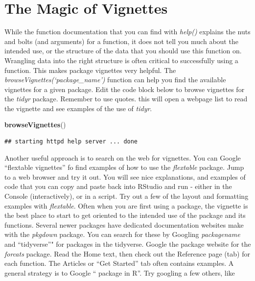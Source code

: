 \documentclass[
]{book}
\newenvironment{Shaded}{\begin{snugshade}}{\end{snugshade}}
\newcommand{\KeywordTok}[1]{\textcolor[rgb]{0.13,0.29,0.53}{\textbf{#1}}}
\newcommand{\NormalTok}[1]{#1}
\begin{document}
\hypertarget{the-magic-of-vignettes}{%
\section{The Magic of Vignettes}\label{the-magic-of-vignettes}}

While the function documentation that you can find with \emph{help()} explains the nuts and bolts (and arguments) for a function, it does not tell you much about the intended use, or the structure of the data that you should use this function on. Wrangling data into the right structure is often critical to successfully using a function.
This makes package vignettes very helpful.
The \emph{browseVignettes(`package\_name')} function can help you find the available vignettes for a given package.
Edit the code block below to browse vignettes for the \emph{tidyr} package. Remember to use quotes. this will open a webpage list to read the vignette and see examples of the use of \emph{tidyr}.

\begin{Shaded}
\begin{Highlighting}[]
\KeywordTok{browseVignettes}\NormalTok{()}
\end{Highlighting}
\end{Shaded}

\begin{verbatim}
## starting httpd help server ... done
\end{verbatim}

Another useful approach is to search on the web for vignettes. You can Google ``flextable vignettes'' fo find examples of how to use the \emph{flextable} package. Jump to a web browser and try it out. You will see nice explanations, and examples of code that you can copy and paste back into RStudio and run - either in the Console (interactively), or in a script. Try out a few of the layout and formatting examples with \emph{flextable}.
Often when you are first using a package, the vignette is the best place to start to get oriented to the intended use of the package and its functions.
Several newer packages have dedicated documentation websites make with the \emph{pkgdown} package. You can search for these by Googling \emph{packagename} and ``tidyverse''" for packages in the tidyverse. Google the package website for the \emph{forcats} package. Read the Home text, then check out the Reference page (tab) for each function. The Articles or ``Get Started'' tab often contains examples.
A general strategy is to Google `` package in R''.
Try googling a few others, like
\end{document}
